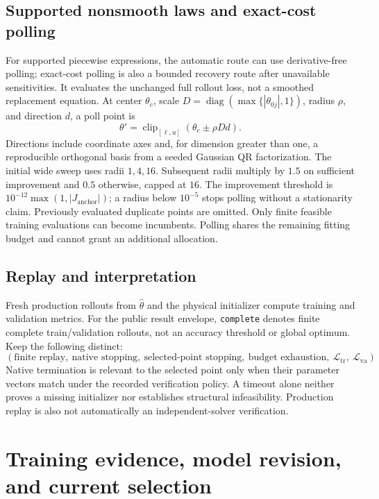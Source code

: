 \documentclass[11pt]{article}
\newcommand{\Loss}{\mathcal{L}}
\DeclareMathOperator{\diag}{diag}
\DeclareMathOperator{\clip}{clip}
\begin{document}
\subsection{Supported nonsmooth laws and exact-cost polling}
For supported piecewise expressions, the automatic route can use derivative-free
polling; exact-cost polling is also a bounded recovery route after unavailable
sensitivities. It evaluates the unchanged full rollout loss, not a smoothed
replacement equation. At center $\theta_c$, scale
$D=\diag(\max\{|\theta_{0j}|,1\})$, radius $\rho$, and direction $d$, a poll point
is
\begin{equation}
 \theta'=\clip_{[\ell,u]}(\theta_c\pm\rho Dd).
\end{equation}
Directions include coordinate axes and, for dimension greater than one, a
reproducible orthogonal basis from a seeded Gaussian QR factorization. The initial
wide sweep uses radii $1,4,16$. Subsequent radii multiply by $1.5$ on sufficient
improvement and $0.5$ otherwise, capped at $16$. The improvement threshold is
$10^{-12}\max(1,|J_{\mathrm{anchor}}|)$; a radius below $10^{-5}$ stops polling
without a stationarity claim. Previously evaluated duplicate points are omitted.
Only finite feasible training evaluations can become incumbents. Polling shares
the remaining fitting budget and cannot grant an additional allocation.

\subsection{Replay and interpretation}
Fresh production rollouts from $\widehat\theta$ and the physical initializer
compute training and validation metrics. For the public result envelope,
\texttt{complete} denotes finite complete train/validation rollouts, not an
accuracy threshold or global optimum. Keep the following distinct:
\begin{equation}
 (\text{finite replay},\ \text{native stopping},\ \text{selected-point stopping},
 \ \text{budget exhaustion},\ \Loss_{\mathrm{tr}},\ \Loss_{\mathrm{va}}).
\end{equation}
Native termination is relevant to the selected point only when their parameter
vectors match under the recorded verification policy. A timeout alone neither
proves a missing initializer nor establishes structural infeasibility. Production
replay is also not automatically an independent-solver verification.

\section{Training evidence, model revision, and current selection}
\label{sec:controller}
\end{document}
